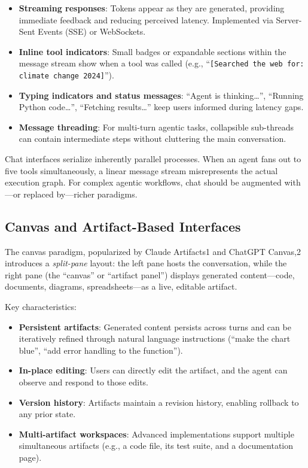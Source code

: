\begin{itemize}
  \item \textbf{Streaming responses}: Tokens appear as they are generated, providing immediate feedback and reducing perceived latency. Implemented via Server-Sent Events (SSE) or WebSockets.
  \item \textbf{Inline tool indicators}: Small badges or expandable sections within the message stream show when a tool was called (e.g., ``\texttt{[Searched the web for: climate change 2024]}'').
  \item \textbf{Typing indicators and status messages}: ``Agent is thinking\ldots{}'', ``Running Python code\ldots{}'', ``Fetching results\ldots{}'' keep users informed during latency gaps.
  \item \textbf{Message threading}: For multi-turn agentic tasks, collapsible sub-threads can contain intermediate steps without cluttering the main conversation.
\end{itemize}

\begin{keybox}
Chat interfaces serialize inherently parallel processes. When an agent fans out to five tools simultaneously, a linear message stream misrepresents the actual execution graph. For complex agentic workflows, chat should be augmented with---or replaced by---richer paradigms.
\end{keybox}

\subsection{Canvas and Artifact-Based Interfaces}
\label{canvas-and-artifact-based-interfaces}

The canvas paradigm, popularized by Claude Artifacts1 and ChatGPT Canvas,2 introduces a \emph{split-pane} layout: the left pane hosts the conversation, while the right pane (the ``canvas'' or ``artifact panel'') displays generated content---code, documents, diagrams, spreadsheets---as a live, editable artifact.

Key characteristics:

\begin{itemize}
  \item \textbf{Persistent artifacts}: Generated content persists across turns and can be iteratively refined through natural language instructions (``make the chart blue'', ``add error handling to the function'').
  \item \textbf{In-place editing}: Users can directly edit the artifact, and the agent can observe and respond to those edits.
  \item \textbf{Version history}: Artifacts maintain a revision history, enabling rollback to any prior state.
  \item \textbf{Multi-artifact workspaces}: Advanced implementations support multiple simultaneous artifacts (e.g., a code file, its test suite, and a documentation page).
\end{itemize}

